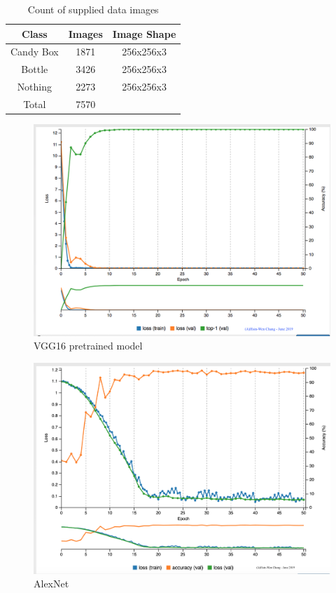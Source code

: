 \documentclass[10pt,journal,compsoc]{IEEEtran}
\begin{document}
\begin{table}[h]
 \begin{center}
      \begin{tabular}{ |c|c|c| } 
       \hline
       Class & Images & Image Shape \\
       \hline
       Candy Box & 1871 & 256x256x3 \\ 
       Bottle & 3426 & 256x256x3 \\ 
       Nothing & 2273 & 256x256x3 \\
       \hline
       Total & 7570 & \\
       \hline
      \end{tabular}
      \caption{Count of supplied data images}
      \label{table:1}
      \end{center}
      \end{table}
\begin{figure}[thpb]
      \centering
      \includegraphics[width=\linewidth]{VGG16AcurracyLoss.png}
      \caption{VGG16 pretrained model}
      \label{fig:robot1}
\end{figure}
\begin{figure}[thpb]
      \centering
      \includegraphics[width=\linewidth]{AlexNet.png}
      \caption{AlexNet}
      \label{fig:robot1}
\end{figure}
\end{document}
